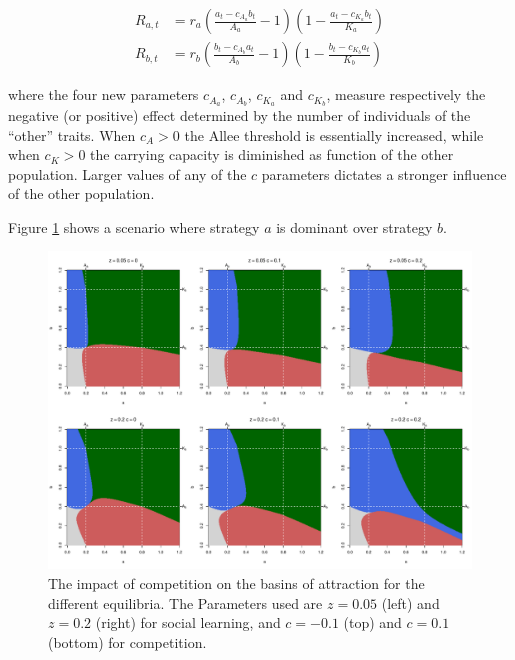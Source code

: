 \documentclass[review,authoryear]{elsarticle}
\begin{document}
\begin{equation}
\begin{aligned}
R_{a,t}& = r_a (\frac{a_t-c_{A_a}b_t}{A_a}-1)(1-\frac{a_t-c_{K_a}b_t}{K_a})\\
R_{b,t}& = r_b (\frac{b_t-c_{A_b}a_t}{A_b}-1)(1-\frac{b_t-c_{K_b}a_t}{K_b}) 
\label{eqCompetition}
\end{aligned}
\end{equation}

where the four new parameters $c_{A_a}$, $c_{A_b}$, $c_{K_a}$ and $c_{K_b}$, measure respectively the negative (or positive) effect determined by the number of individuals of the “other” traits. When $c_{A}>0$ the Allee threshold is essentially increased, while when $c_{K}>0$ the carrying capacity is diminished as function of the other population. Larger values of any of the $c$ parameters dictates a stronger influence of the other population. 






Figure \ref{fig:competition} shows a scenario where strategy $a$ is dominant over strategy $b$.

\begin{figure}[h!]
  \centering
      \includegraphics[width=\textwidth]{./figures/figure7}
  \caption{The impact of competition on the basins of attraction for the different equilibria. The Parameters used are $z=0.05$ (left) and $z=0.2$ (right) for social learning, and $c=-0.1$ (top) and $c=0.1$ (bottom) for competition.}
    \label{fig:competition}
\end{figure}
\end{document}
